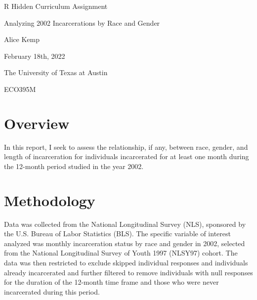 \documentclass[12pt]{article}
\begin{document}
\begin{titlepage}
   \begin{center}
        \vspace*{5cm}

        \Huge{R Hidden Curriculum Assignment}

        \vspace{0.5cm}
        \LARGE{Analyzing 2002 Incarcerations by Race and Gender}
            
        \vspace{3 cm}
        \Large{Alice Kemp}
       
        \vspace{3 cm}
        \Large{February 18th, 2022}
        
        \vspace{0.25 cm}
        \Large{The University of Texas at Austin}

        \vspace{0.25 cm}
        \Large{ECO395M}
       

       \vfill
    \end{center}
\end{titlepage}

\setcounter{page}{2}
\pagestyle{fancy}
\fancyhf{}
\rhead{\thepage}

\section*{Overview}
In this report, I seek to assess the relationship, if any, between race, gender, and length of incarceration for individuals incarcerated for at least one month during the 12-month period studied in the year 2002.  

\section*{Methodology}
Data was collected from the National Longitudinal Survey (NLS), sponsored by the U.S. Bureau of Labor Statistics (BLS). The specific variable of interest analyzed was monthly incarceration status by race and gender in 2002, selected from the National Longitudinal Survey of Youth 1997 (NLSY97) cohort.
The data was then restricted to exclude skipped individual responses and individuals already incarcerated and further filtered to remove individuals with null responses for the duration of the 12-month time frame and those who were never incarcerated during this period.  
\end{document}
